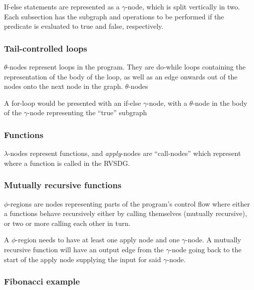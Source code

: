 If-else statements are represented as a $\gamma$-node, which is split vertically
in two. Each subsection has the subgraph and operations to be performed if the
predicate is evaluated to true and false, respectively.

\subsubsection{Tail-controlled loops}

\textit{$\theta$}-nodes represent loops in the program. They are do-while loops
containing the representation of the body of the loop, as well as an edge
onwards out of the nodes onto the next node in the graph. $\theta$-nodes

A for-loop would be presented with an if-else $\gamma$-node, with a
$\theta$-node in the body of the $\gamma$-node representing the ``true''
subgraph

\subsubsection{Functions}

\textit{$\lambda$}-nodes represent functions, and \textit{apply}-nodes are
``call-nodes'' which represent where a function is called in the RVSDG.

\subsubsection{Mutually recursive functions}

\textit{$\phi$}-regions are nodes representing parts of the program's
control flow where either a functions behave recursively either by calling
themselves (mutually recursive), or two or more calling each other in turn.

A $\phi$-region needs to have at least one apply node and one $\gamma$-node. A
mutually recursive function will have an output edge from the $\gamma$-node
going back to the start of the apply node supplying the input for said
$\gamma$-node.

\subsubsection{Fibonacci example}
